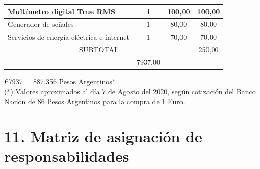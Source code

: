 \documentclass[11pt]{charter}
\begin{document}
\begin{table}[htpb]
\begin{tabularx}{\linewidth}{@{}|X|c|r|r|@{}}
\multicolumn{1}{|l|}{Multímetro digital True RMS}
	&
   \multicolumn{1}{c|}{1}&
   \multicolumn{1}{c|}{100,00}&
   \multicolumn{1}{c|}{100,00}\\ \hline
   
   
\multicolumn{1}{|l|}{Generador de señales} &
\multicolumn{1}{c|}{1}&
\multicolumn{1}{c|}{80,00}&
\multicolumn{1}{c|}{80,00}\\ \hline


\multicolumn{1}{|l|}{Servicios de energía eléctrica e internet} &
\multicolumn{1}{c|}{1}&
\multicolumn{1}{c|}{70,00}&
\multicolumn{1}{c|}{70,00}\\ \hline
   
\multicolumn{3}{|c|}{SUBTOTAL} &
  \multicolumn{1}{c|}{250,00} \\ \hline
\rowcolor[HTML]{C0C0C0}
\multicolumn{3}{|c|}{TOTAL} &
   \multicolumn{1}{c|}{7937,00}\\ \hline
\end{tabularx}%
\end{table}
\euro{7937} = 887.356 Pesos Argentinos*\\
(*) Valores aproximados al día 7 de Agosto del 2020, según cotización del Banco Nación de 86 Pesos Argentinos para la compra de 1 Euro.

\section{11. Matriz de asignación de responsabilidades}
\label{sec:responsabilidades}
\end{document}
